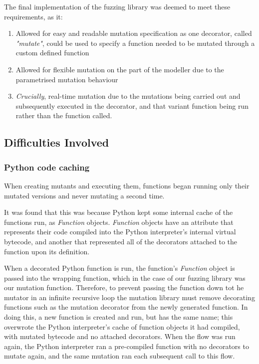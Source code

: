 The final implementation of the fuzzing library was deemed to meet these requirements, as it: 

\begin{enumerate}  %
    \item Allowed for easy and readable mutation specification as one decorator, called \emph{"mutate"}, could be used to specify a function needed to be mutated through a custom defined function
    \item Allowed for flexible mutation on the part of the modeller due to the parametrised mutation behaviour
    \item \emph{Crucially}, real-time mutation due to the mutations being carried out and subsequently executed in the decorator, and that variant function being run rather than the function called.
\end{enumerate} \par

\subsection{Difficulties Involved}
\subsubsection{Python code caching}
When creating mutants and executing them, functions began running only their mutated versions and never mutating a second time. \par

It was found that this was because Python kept some internal cache of the functions run, as \emph{Function} objects. \emph{Function} objects have an attribute that represents their code compiled into the Python interpreter's internal virtual bytecode, and another that represented all of the decorators attached to the function upon its definition. \par

When a decorated Python function is run, the function's \emph{Function} object is passed into the wrapping function, which in the case of our fuzzing library was our mutation function. Therefore, to prevent passing the function down tot he mutator in an infinite recursive loop the mutation library must remove decorating functions such as the mutation decorator from the newly generated function. In doing this, a new function is created and run, but has the same name; this overwrote the Python interpreter's cache of function objects it had compiled, with mutated bytecode and no attached decorators. When the flow was run again, the Python interpreter ran a pre-compiled function with no decorators to mutate again, and the same mutation ran each subsequent call to this flow. \par

